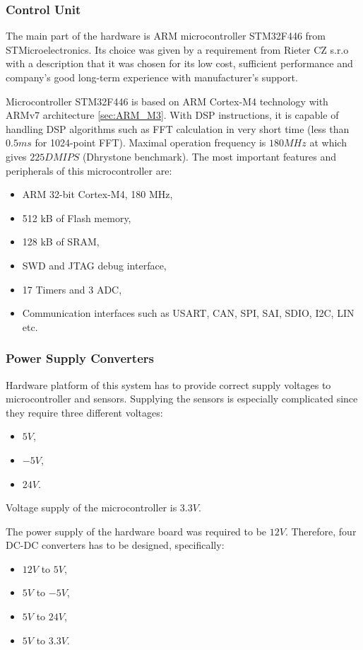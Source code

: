 \documentclass[twoside]{ctuthesis}
\theoremstyle{plain}
\theoremstyle{definition}
\theoremstyle{note}
\begin{document}
\subsubsection{Control Unit}
\label{sec:microController}
	The main part of the hardware is ARM microcontroller STM32F446 from STMicroelectronics. Its choice was given by a requirement from Rieter CZ s.r.o with a description that it was chosen for its low cost, sufficient performance and company's good long-term experience with manufacturer's support. 
	
	Microcontroller STM32F446 is based on ARM Cortex-M4 technology with ARMv7 architecture \ref{sec:ARM_M3}. With DSP instructions, it is capable of handling DSP algorithms such as FFT calculation in very short time (less than $0.5 ms$ for 1024-point FFT). Maximal operation frequency is $180 MHz$ at which gives $225 DMIPS$ (Dhrystone benchmark). The most important features and peripherals of this microcontroller are:
\begin{itemize}
	\setlength{\itemsep}{5pt}
	\item ARM 32-bit Cortex-M4, 180 MHz,
	\item 512 kB of Flash memory,
	\item 128 kB of SRAM,
	\item SWD and JTAG debug interface,
	\item 17 Timers and 3 ADC,
	\item Communication interfaces such as USART, CAN, SPI, SAI, SDIO, I2C, LIN etc.
\end{itemize}	
\subsubsection{Power Supply Converters}
Hardware platform of this system has to provide correct supply voltages to microcontroller and sensors. Supplying the sensors is especially complicated since they require three different voltages:
\begin{itemize}
	\setlength{\itemsep}{5pt}
	\item $5 V$,
	\item $-5 V$,
	\item $24 V$.
\end{itemize}
Voltage supply of the microcontroller is $3.3 V$.

The power supply of the hardware board was required to be $12 V$. Therefore, four DC-DC converters has to be designed, specifically:
\begin{itemize}
	\setlength{\itemsep}{5pt}
	\item $12 V$ to $5 V$,
	\item $5 V$ to $-5 V$,
	\item $5 V$ to $24 V$,
	\item $5 V$ to $3.3 V$.
\end{itemize}
\end{document}
